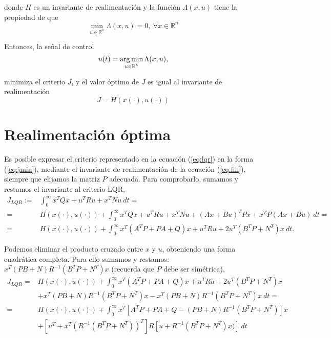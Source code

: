 donde $H$ es un invariante de realimentación y la función $\Lambda(x,u)$ tiene la propiedad de que
\begin{equation*}
\min_{u \in \mathbb{R}^k} \Lambda(x,u) = 0,\ \forall x \in \mathbb{R}^n
\end{equation*}

Entonces, la señal de control
\begin{equation*}
u(t) = \argmin_{u \in \mathbb{R}^k} \Lambda (x,u),
\end{equation*}

minimiza el criterio $J$, y el valor óptimo de $J$ es igual al invariante de realimentación
\begin{equation*}
J = H\left(x(\cdot),u(\cdot)\right)
\end{equation*}

\section{Realimentación óptima}

Es posible expresar el criterio representado en la ecuación (\ref{eq:lqr}) en la forma (\ref{eq:jmin}), mediante el invariante de realimentación de la ecuación (\ref{eq.fin}), siempre que elijamos la matriz $P$ adecuada. Para comprobarlo, sumamos y restamos el invariante al criterio LQR,
 \begin{equation*}
 \begin{split}
J_{LQR} :=& \int_0^{\infty}x^TQx+u^TRu+x^TNu\  dt =\\
=& H\left(x(\cdot),u(\cdot)\right) + \int_0^{\infty}x^TQx+u^TRu+x^TNu+\left(Ax+Bu\right)^TPx+x^TP\left(Ax+Bu\right) \  dt=\\ 
=& H\left(x(\cdot),u(\cdot)\right) + \int_0^{\infty}x^T(A^TP+PA+Q)x+u^TRu+2u^T(B^TP+N^T)x\ dt.
\end{split}
\end{equation*}

Podemos eliminar el producto cruzado entre $x$ y $u$, obteniendo una forma cuadrática completa. Para ello sumamos  y restamos: $x^T(PB+N)R^{-1}(B^TP+N^T)x$ (recuerda que $P$ debe ser simétrica),
\begin{equation*}
\begin{split}
J_{LQR} =&H\left(x(\cdot),u(\cdot)\right) + \int_0^{\infty}x^T(A^TP+PA+Q)x+u^TRu+2u^T(B^TP+N^T)x\\
&+ x^T(PB+N)R^{-1}(B^TP+N^T)x-x^T(PB+N)R^{-1}(B^TP+N^T)x \ dt =\\
=&H\left(x(\cdot),u(\cdot)\right) + \int_0^{\infty}x^T\left[A^TP+PA+Q-(PB+N)R^{-1}(B^TP+N^T)\right]x\\
&+\left[u^T+x^T\left(R^{-1}(B^TP+N^T)\right)^T\right]R\left[u+R^{-1}(B^TP+N^T)x)\right]\ dt
\end{split}
\end{equation*}

